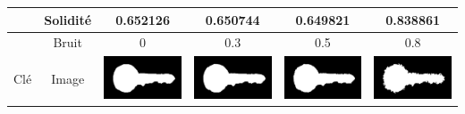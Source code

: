 \documentclass{article}
\theoremstyle{definition}
\begin{document}
\begin{table}[!h]
\begin{tabular}{|c|c|c|c|c|c|}
	    \cline{2-6}
	    & Solidité & 0.652126 & 0.650744 & 0.649821 & 0.838861 \\
	    \hline
	    \hline
	    & Bruit & 0 & 0.3 & 0.5 & 0.8 \\
	    \cline{2-6}
	    Clé & Image & \includegraphics[scale=0.15]{Illustrations/key-6-debruite.png} & \includegraphics[scale=0.15]{Illustrations/key-6-debruite(3).png} & \includegraphics[scale=0.15]{Illustrations/key-6-debruite(5).png} & \includegraphics[scale=0.15]{Illustrations/key-6-debruite(8).png} \\

\end{tabular}
\end{table}
\end{document}
